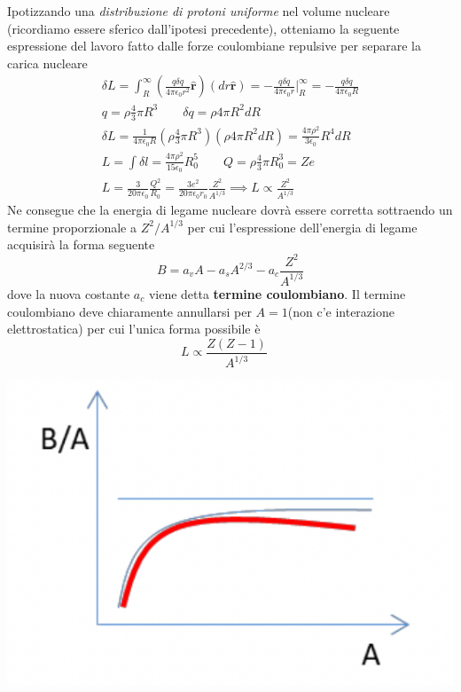 Ipotizzando una \emph{distribuzione di protoni uniforme} nel volume
nucleare (ricordiamo essere sferico dall'ipotesi precedente), otteniamo
la seguente espressione del lavoro fatto dalle forze coulombiane
repulsive per separare la carica nucleare
\begin{gather*}
	\delta L = \int _{R}^{\infty} \left( \frac{q \delta q}{4 \pi \epsilon_{0}r^{2}}  \hat{\bm{r}} \right)(dr \hat{\bm{r}})=
	- \frac{q \delta q}{4 \pi \epsilon_{0}r} \bigg |_{R}^{\infty} =
	- \frac{q \delta q}{4 \pi \epsilon_{0}R}\\
	q = \rho \frac{ 4}{3} \pi R^{3} \qquad \delta q = \rho 4 \pi R^{2} dR\\
	\delta L = \frac{1}{4 \pi \epsilon_{0}R}\left( \rho \frac{ 4}{3}\pi R^{3} \right)(\rho 4 \pi R^{2} dR) = \frac{4 \pi \rho^{2}}{3 \epsilon_{0}}R^{4}dR\\
	L = \int \delta l = \frac{4 \pi \rho^{2}}{15 \epsilon_{0}}R_{0}^{5} \qquad Q = \rho \frac{ 4}{3} \pi R_{0}^{3} = Ze\\
	L = \frac{3}{20 \pi \epsilon_{0}} \frac{Q^{2}}{R_{0}} = \frac{3e^{2}}{20 \pi \epsilon_{0}r_{0}} \frac{Z^{2}}{A^{1/3}}
	\implies L \propto \frac{ Z^{2}}{A^{1/3}}
\end{gather*} Ne consegue che la energia di legame nucleare dovrà essere corretta
sottraendo un termine proporzionale a \(Z^{2} / A^{1/3}\) per cui
l'espressione dell'energia di legame acquisirà la forma seguente
\begin{equation}
	B = a_{v}A - a_{s}A^{2/3} - a_{c} \frac{Z^{2}}{A^{1/3}}
	\label{eq:coulomb-term-drop-model}
\end{equation}
 dove la nuova costante \(a_{c}\) viene detta \textbf{termine
	coulombiano}.
Il termine coulombiano deve chiaramente annullarsi per
\(A=1\)(non c'e interazione elettrostatica) per cui l'unica forma
possibile è
\begin{equation}
	L \propto \frac{Z(Z-1)}{A^{1/3}} \quad
   \label{eq:work-to-seperate-uniformly-distributed-protons}
\end{equation}
\begin{marginfigure}
	\includegraphics{figs/goccia3}
	\label{fig:goccia3}
\end{marginfigure}


